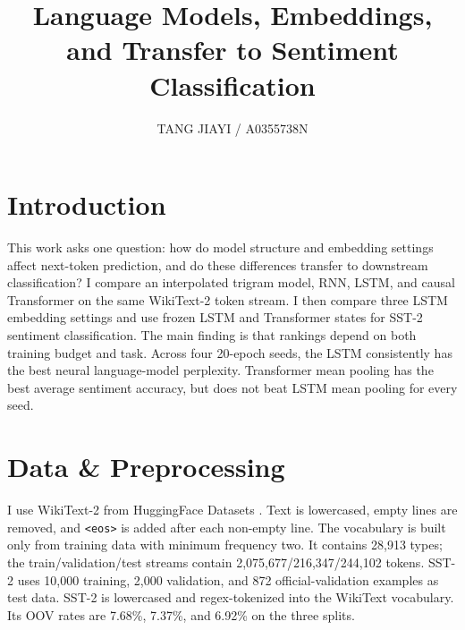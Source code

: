 \documentclass[11pt,a4paper]{article}
\title{\vspace{-1.5em}Language Models, Embeddings, and Transfer to Sentiment Classification}
\author{TANG JIAYI / A0355738N}
\date{}
\begin{document}
\maketitle
\vspace{-2em}

\section{Introduction}
This work asks one question: how do model structure and embedding settings affect next-token
prediction, and do these differences transfer to downstream classification? I compare an
interpolated trigram model, RNN, LSTM, and causal Transformer on the same WikiText-2 token stream.
I then compare three LSTM embedding settings and use frozen LSTM and Transformer states for SST-2
sentiment classification. The main finding is that rankings depend on both training budget and
task. Across four 20-epoch seeds, the LSTM consistently has the best neural language-model
perplexity. Transformer mean pooling has the best average sentiment accuracy, but does not beat
LSTM mean pooling for every seed.

\section{Data \& Preprocessing}
I use WikiText-2 \citep{merity2017wikitext} from HuggingFace Datasets
\citep{lhoest2021datasets}. Text is lowercased, empty lines are removed, and \texttt{<eos>} is
added after each non-empty line. The vocabulary is built only from training data with minimum
frequency two. It contains 28,913 types; the train/validation/test streams contain
2,075,677/216,347/244,102 tokens. SST-2 \citep{socher2013sst,wang2018glue} uses 10,000 training,
2,000 validation, and 872 official-validation examples as test data. SST-2 is lowercased and
regex-tokenized into the WikiText vocabulary. Its OOV rates are 7.68\%, 7.37\%, and 6.92\% on the
three splits.
\end{document}
